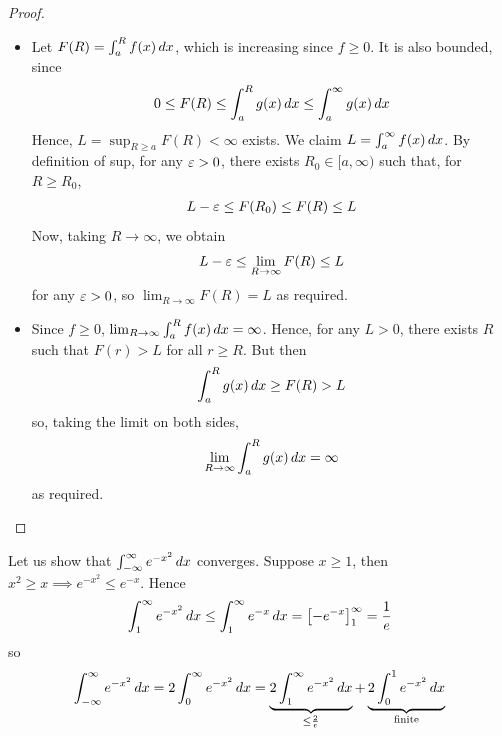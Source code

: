 \documentclass{../template/note}
\begin{document}
    \begin{proof}
        \begin{itemize}
            \item Let \(F(R) = \int_a^R f(x) \,d{x}\), which is increasing since \(f \geq 0\). It is also bounded, since
            \begin{align*}
                0 \leq F(R) \leq \int_a^R g(x) \,d{x} \leq \int_a^\infty g(x) \,d{x}
            \end{align*}
            Hence, \(L = \sup_{R \geq a} F(R) < \infty\) exists. We claim \(L = \int_a^\infty f(x) \,d{x}\). By definition of sup, for any \(\varepsilon > 0\), there exists \(R_0 \in [a, \infty)\) such that, for \(R \geq R_0\),
            \begin{align*}
                L-\varepsilon \leq F(R_0) \leq F(R) \leq L
            \end{align*}
            Now, taking \(R \to \infty\), we obtain
            \begin{align*}
                L-\varepsilon \leq \lim_{R \to \infty} F(R) \leq L
            \end{align*}
            for any \(\varepsilon > 0\), so \(\lim_{R \to \infty} F(R) = L\) as required.
            \item Since \(f \geq 0\), \(\lim_{R \to \infty} \int_a^R f(x) \,d{x} = \infty\). Hence, for any \(L > 0\), there exists \(R\) such that \(F(r) > L\) for all \(r \geq R\). But then
            \begin{align*}
                \int_a^R g(x) \,d{x} \geq F(R) > L
            \end{align*}
            so, taking the limit on both sides,
            \begin{align*}
                \lim_{R \to \infty} \int_a^R g(x) \,d{x} = \infty
            \end{align*}
            as required.
        \end{itemize}
    \end{proof}
    
    \begin{example*}
        Let us show that \(\int_{-\infty}^\infty e^{-x^2} \,d{x}\) converges. Suppose \(x \geq 1\), then \(x^2 \geq x \implies e^{-x^2} \leq e^{-x}\). Hence
        \begin{align*}
            \int_1^\infty e^{-x^2} \,d{x} \leq \int_1^\infty e^{-x} \,d{x} = \left[-e^{-x}\right]_1^{\infty} = \frac 1 e
        \end{align*}
        so
        \begin{align*}
            \int_{-\infty}^\infty e^{-x^2} \,d{x} = 2 \int_0^\infty e^{-x^2} \,d{x} = \underbrace{2 \int_1^\infty e^{-x^2} \,d{x}}_{\leq \frac 2 e} + \underbrace{2 \int_0^1 e^{-x^2} \,d{x}}_{\text{finite}}
        \end{align*}
    \end{example*}
    
\end{document}
